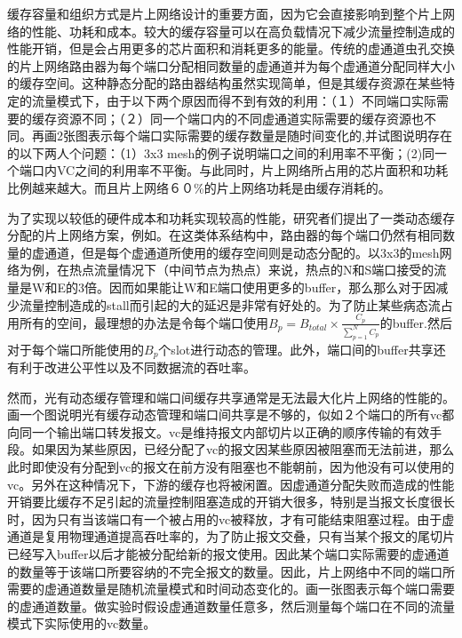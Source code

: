 ﻿\documentclass[10pt,journal]{IEEEtran}
\begin{document}
缓存容量和组织方式是片上网络设计的重要方面，因为它会直接影响到整个片上网络的性能、功耗和成本。较大的缓存容量可以在高负载情况下减少流量控制造成的性能开销，但是会占用更多的芯片面积和消耗更多的能量。传统的虚通道虫孔交换的片上网络路由器为每个端口分配相同数量的虚通道并为每个虚通道分配同样大小的缓存空间\cite{DaTo01}。这种静态分配的路由器结构虽然实现简单，但是其缓存资源在某些特定的流量模式下，由于以下两个原因而得不到有效的利用：（１）不同端口实际需要的缓存资源不同；（２）同一个端口内的不同虚通道实际需要的缓存资源也不同。再画2张图表示每个端口实际需要的缓存数量是随时间变化的,并试图说明存在的以下两人个问题：（1）3x3 mesh的例子说明端口之间的利用率不平衡；(2)同一个端口内VC之间的利用率不平衡。与此同时，片上网络所占用的芯片面积和功耗比例越来越大\cite{1650108}。而且片上网络６０\%的片上网络功耗是由缓存消耗的\cite{ChPe03}。

为了实现以较低的硬件成本和功耗实现较高的性能，研究者们提出了一类动态缓存分配的片上网络方案，例如\cite{NPKV06}\cite{4555894}\cite{5770788}\cite{Neishaburi:2009:RAN:1531542.1531658}\cite{6310960}。在这类体系结构中，路由器的每个端口仍然有相同数量的虚通道，但是每个虚通道所使用的缓存空间则是动态分配的。以3x3的mesh网络为例，在热点流量情况下（中间节点为热点）来说，热点的N和S端口接受的流量是W和E的3倍。因而如果能让W和E端口使用更多的buffer，那么那么对于因减少流量控制造成的stall而引起的大的延迟是非常有好处的。为了防止某些病态流占用所有的空间，最理想的办法是令每个端口使用$B_p=B_{total}\times\frac{C_p}{\sum_{p=1}^NC_p}$的buffer.然后对于每个端口所能使用的$B_p$个slot进行动态的管理。此外，端口间的buffer共享还有利于改进公平性以及不同数据流的吞吐率。

然而，光有动态缓存管理和端口间缓存共享通常是无法最大化片上网络的性能的。画一个图说明光有缓存动态管理和端口间共享是不够的，似如２个端口的所有vc都向同一个输出端口转发报文。vc是维持报文内部切片以正确的顺序传输的有效手段。如果因为某些原因，已经分配了vc的报文因某些原因被阻塞而无法前进，那么此时即使没有分配到vc的报文在前方没有阻塞也不能朝前，因为他没有可以使用的vc。另外在这种情况下，下游的缓存也将被闲置。因虚通道分配失败而造成的性能开销要比缓存不足引起的流量控制阻塞造成的开销大很多，特别是当报文长度很长时，因为只有当该端口有一个被占用的vc被释放，才有可能结束阻塞过程。由于虚通道是复用物理通道提高吞吐率的，为了防止报文交叠，只有当某个报文的尾切片已经写入buffer以后才能被分配给新的报文使用。因此某个端口实际需要的虚通道的数量等于该端口所要容纳的不完全报文的数量。因此，片上网络中不同的端口所需要的虚通道数量是随机流量模式和时间动态变化的。画一张图表示每个端口需要的虚通道数量。做实验时假设虚通道数量任意多，然后测量每个端口在不同的流量模式下实际使用的vc数量。
\end{document}
